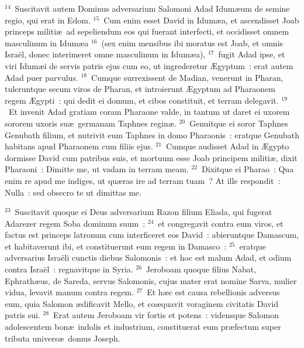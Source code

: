 ${}^{14}$~Suscitavit autem Dominus adversarium Salomoni Adad Idum\ae um de semine regio, qui erat in Edom.
${}^{15}$~Cum enim esset David in Idum\ae a, et ascendisset Joab princeps militi\ae\ ad sepeliendum eos qui fuerant interfecti, et occidisset omnem masculinum in Idum\ae a
${}^{16}$~(sex enim mensibus ibi moratus est Joab, et omnis Isra\"el, donec interimeret omne masculinum in Idum\ae a),
${}^{17}$~fugit Adad ipse, et viri Idum\ae i de servis patris ejus cum eo, ut ingrederetur \AE gyptum~: erat autem Adad puer parvulus.
${}^{18}$~Cumque surrexissent de Madian, venerunt in Pharan, tuleruntque secum viros de Pharan, et introierunt \AE gyptum ad Pharaonem regem \AE gypti~: qui dedit ei domum, et cibos constituit, et terram delegavit.
${}^{19}$~Et invenit Adad gratiam coram Pharaone valde, in tantum ut daret ei uxorem sororem uxoris su\ae\ germanam Taphnes regin\ae .
${}^{20}$~Genuitque ei soror Taphnes Genubath filium, et nutrivit eum Taphnes in domo Pharaonis~: eratque Genubath habitans apud Pharaonem cum filiis ejus.
${}^{21}$~Cumque audisset Adad in \AE gypto dormisse David cum patribus suis, et mortuum esse Joab principem militi\ae , dixit Pharaoni~: Dimitte me, ut vadam in terram meam.
${}^{22}$~Dixitque ei Pharao~: Qua enim re apud me indiges, ut qu\ae ras ire ad terram tuam~? At ille respondit~: Nulla~: sed obsecro te ut dimittas me.


${}^{23}$~Suscitavit quoque ei Deus adversarium Razon filium Eliada, qui fugerat Adarezer regem Soba dominum suum~:
${}^{24}$~et congregavit contra eum viros, et factus est princeps latronum cum interficeret eos David~: abieruntque Damascum, et habitaverunt ibi, et constituerunt eum regem in Damasco~:
${}^{25}$~eratque adversarius Isra\"eli cunctis diebus Salomonis~: et hoc est malum Adad, et odium contra Isra\"el~: regnavitque in Syria.
${}^{26}$~Jeroboam quoque filius Nabat, Ephrath\ae us, de Sareda, servus Salomonis, cujus mater erat nomine Sarva, mulier vidua, levavit manum contra regem.
${}^{27}$~Et h\ae c est causa rebellionis adversus eum, quia Salomon \ae dificavit Mello, et co\ae quavit voraginem civitatis David patris sui.
${}^{28}$~Erat autem Jeroboam vir fortis et potens~: vidensque Salomon adolescentem bon\ae\ indolis et industrium, constituerat eum pr\ae fectum super tributa univers\ae\ domus Joseph.


